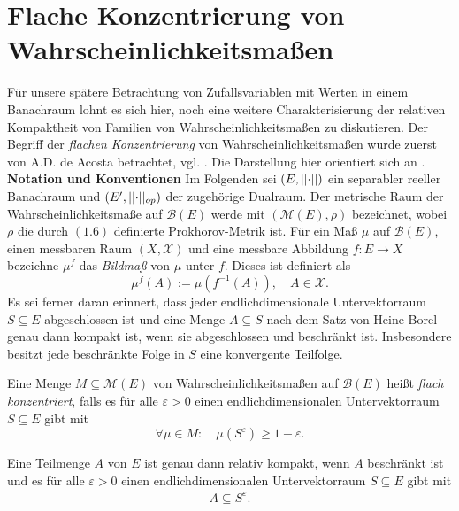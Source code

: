 \section{Flache Konzentrierung von Wahrscheinlichkeitsmaßen}
Für unsere spätere Betrachtung von Zufallsvariablen mit Werten in einem Banachraum lohnt es sich hier, noch eine weitere Charakterisierung der relativen Kompaktheit von Familien von Wahrscheinlichkeitsmaßen zu diskutieren. 
Der Begriff der \textit{flachen Konzentrierung} von Wahrscheinlichkeitsmaßen wurde zuerst von A.D. de Acosta betrachtet, vgl. \cite{acosta}. 
Die Darstellung hier orientiert sich an \cite{vakhania}. 
\newline \ \newline 
\textbf{Notation und Konventionen} \newline 
Im Folgenden sei $(E, \lvert\lvert \cdot \rvert\rvert)$ ein separabler reeller Banachraum und $(E', \lvert\lvert \cdot \rvert\rvert_{op})$ der zugehörige Dualraum. Der metrische Raum der Wahrscheinlichkeitsmaße auf $\mathcal{B}(E)$ werde mit $(\mathcal{M}(E), \rho)$ bezeichnet, wobei 
$\rho$ die durch $(1.6)$ definierte Prokhorov-Metrik ist. Für ein Maß $\mu$ auf $\mathcal{B}(E)$, einen messbaren Raum $(X, \mathcal{X})$ und eine messbare Abbildung $f:E \to X$ bezeichne $\mu^f$ das \textit{Bildmaß} von $\mu$ unter $f$. Dieses ist definiert als 
$$
    \mu^f(A) := \mu(f^{-1}(A)), \quad A \in \mathcal{X}. 
$$
Es sei ferner daran erinnert, dass jeder endlichdimensionale Untervektorraum  $S \subseteq E$ abgeschlossen ist und eine Menge $A \subseteq S$ nach dem Satz von Heine-Borel genau dann kompakt ist, wenn sie abgeschlossen und beschränkt ist. 
Insbesondere besitzt jede beschränkte Folge in $S$ eine konvergente Teilfolge. 
\begin{mydef}
    Eine Menge $M \subseteq \mathcal{M}(E)$ von Wahrscheinlichkeitsmaßen auf $\mathcal{B}(E)$ heißt \textit{flach konzentriert}, falls es für alle $\varepsilon > 0$ einen endlichdimensionalen 
    Untervektorraum $S \subseteq E$ gibt mit 
    $$
        \forall \mu \in M: \quad \mu(S^{\varepsilon}) \geq 1 - \varepsilon.
    $$ 
\end{mydef}

\begin{lemma}
    Eine Teilmenge $A$ von $E$ ist genau dann relativ kompakt, wenn $A$ beschränkt ist und es für alle $\varepsilon > 0$ einen endlichdimensionalen Untervektorraum $S \subseteq E$ gibt mit 
    \begin{align*}
        A \subseteq S^{\varepsilon}. 
    \end{align*}
\end{lemma}

